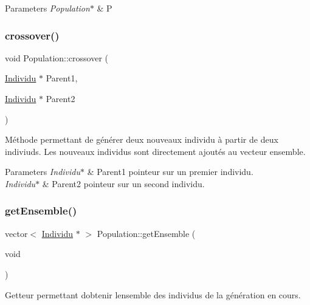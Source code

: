 \begin{DoxyParams}{Parameters}
{\em Population$\ast$} & P \\
\hline
\end{DoxyParams}
\mbox{\label{class_population_a728129af67cfe97c0fa16d0728101a28}} 
\subsubsection{\texorpdfstring{crossover()}{crossover()}}
{\footnotesize\ttfamily void Population\+::crossover (\begin{DoxyParamCaption}\item[{\hyperlink{class_individu}{Individu} $\ast$}]{Parent1,  }\item[{\hyperlink{class_individu}{Individu} $\ast$}]{Parent2 }\end{DoxyParamCaption})}



Méthode permettant de générer deux nouveaux individu à partir de deux indiviuds. Les nouveaux individus sont directement ajoutés au vecteur ensemble. 


\begin{DoxyParams}{Parameters}
{\em Individu$\ast$} & Parent1 pointeur sur un premier individu. \\
\hline
{\em Individu$\ast$} & Parent2 pointeur sur un second individu. \\
\hline
\end{DoxyParams}
\mbox{\label{class_population_a2616c1ee49a009f91f36ff6a2798784b}} 
\subsubsection{\texorpdfstring{get\+Ensemble()}{getEnsemble()}}
{\footnotesize\ttfamily vector$<$ \hyperlink{class_individu}{Individu} $\ast$ $>$ Population\+::get\+Ensemble (\begin{DoxyParamCaption}\item[{void}]{ }\end{DoxyParamCaption})}



Getteur permettant d\textquotesingle{}obtenir l\textquotesingle{}ensemble des individus de la génération en cours. 


